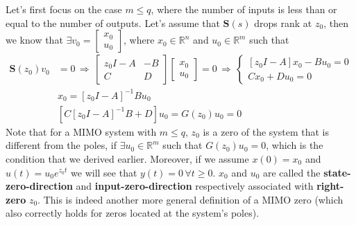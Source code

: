 \documentclass[twoside]{article}
\begin{document}
Let's first focus on the case $m \leq q$, where the number of inputs is less than or equal to the number of outputs. 
Let's assume that $\mathbf{S}(s)$ drops rank at $z_0$, then we know that $\exists v_0 = \begin{bmatrix} x_0 \\ u_0 \end{bmatrix}$, where $x_0 \in \mathbb{R}^{n}$ and $u_0 \in \mathbb{R}^m$ such that 
%
%
\begin{align*}
\mathbf{S}(z_0) v_0 &= 0
\, \Rightarrow \,
\left[ \begin{array}{c|c} z_0 I - A & -B \\ \hline C & D \end{array} \right] \begin{bmatrix} x_0 \\ u_0 \end{bmatrix} = 0
\, \Rightarrow \,
 \begin{cases} \left[ z_0 I - A \right] x_0 - B u_0 = 0 \\ C x_0 + D u_0 = 0 \end{cases}
 \\
 &x_0 =  \left[ z_0 I - A \right]^{-1} B u_0 \\
&\left[ C \left[ z_0 I - A \right]^{-1} B  + D \right] u_0 = G(z_0) u_0 =  0 
\end{align*}
%
Note that for a MIMO system with $m \leq q$, $z_0$ is a zero of the system that is different from the poles, 
if $\exists u_0 \in \mathbb{R}^m$ such that $G(z_0) u_0 = 0$, which is the condition that we derived earlier. Moreover, if we 
assume $x(0) = x_0$ and $u(t) = u_0 e^{z_0 t}$ we will see that $y(t) = 0 \, \forall t \geq 0$. $x_0$ and $u_0$ are called the \textbf{state-zero-direction} and \textbf{input-zero-direction} respectively associated with \textbf{right-zero} $z_0$. This is indeed another more general definition of a MIMO zero (which also correctly holds for zeros located at the system's poles).
\end{document}
